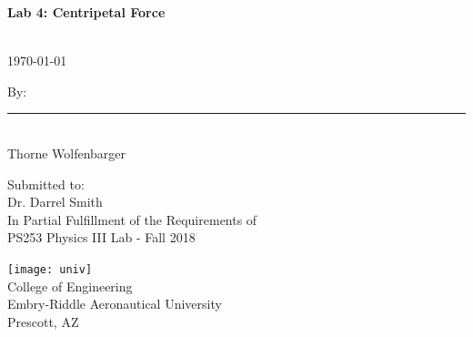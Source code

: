 \begin{titlepage}
  \begin{center}
      \vspace*{1cm}

      \Large
      \textbf{Lab 4: Centripetal Force}

      \vspace{0.5cm}
      \large
      ~\\
      \normalsize \today

      \vspace{1.5cm}

      \large
      By: \\
      \normalsize
      \vspace{7ex}
      \rule{240pt}{1pt}\\
      \vspace{3ex}
      Thorne Wolfenbarger
      \vfill\null
      \vfill

      \vspace{0.8cm}

      \large
      Submitted to: \\
      Dr. Darrel Smith \\
      In Partial Fulfillment of the Requirements of \\
      PS253 Physics III Lab - Fall 2018\\

      \vspace{0.8cm}

      \texttt{[image: univ]}
      ~\\
      College of Engineering\\
      Embry-Riddle Aeronautical University\\
      Prescott, AZ\\

  \end{center}
\end{titlepage}
